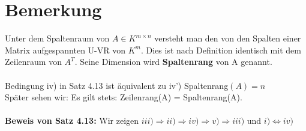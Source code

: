 \documentclass{scrbook}
\begin{document}
\section{Bemerkung}
Unter dem Spaltenraum von $A \in K^{m \times n}$ versteht man den von den Spalten einer Matrix aufgespannten U-VR von $K^m$. Dies ist nach Definition identisch mit dem Zeilenraum von $A^T$. Seine Dimension wird \textbf{Spaltenrang} von A genannt.\\\\Bedingung iv) in Satz 4.13 ist äquivalent zu iv') Spaltenrang$(A)=n$\\Später sehen wir: Es gilt stets: Zeilenrang(A) = Spaltenrang(A).\\\\
\textbf{Beweis von Satz 4.13:} Wir zeigen $iii) \Rightarrow ii) \Rightarrow iv) \Rightarrow v) \Rightarrow iii) $ und $i) \Leftrightarrow iv)$
\end{document}
